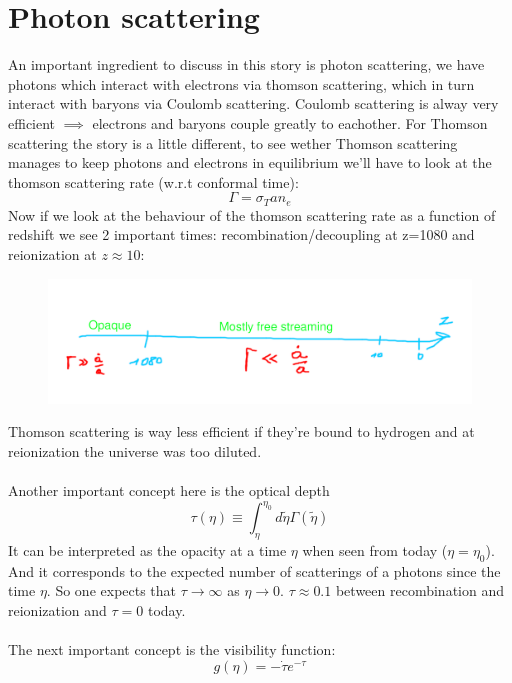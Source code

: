 \documentclass{article}
\begin{document}
 \section{Photon scattering}
 An important ingredient to discuss in this story is photon scattering, we have photons which interact with electrons via thomson scattering, which in turn interact with baryons via Coulomb scattering. Coulomb scattering is alway very efficient $\implies$ electrons and baryons couple greatly to eachother. For Thomson scattering the story is a little different, to see wether Thomson scattering manages to keep photons and electrons in equilibrium we'll have to look at the thomson scattering rate (w.r.t conformal time):
\begin{equation}
   \Gamma = \sigma_T a n_e
\end{equation}
Now if we look at the behaviour of the thomson scattering rate as a function of redshift we see 2 important times: recombination/decoupling at z=1080 and reionization at $z\approx 10$:
\begin{figure}[h]
  \centering
  \includegraphics[scale=0.8]{universetimeline.png}
\end{figure}
Thomson scattering is way less efficient if they're bound to hydrogen and at reionization the universe was too diluted.\\\\
Another important concept here is the optical depth 
\begin{equation}
  \tau(\eta) \equiv \int_\eta^{\eta_0}d\tilde{\eta}\Gamma(\tilde{\eta})
\end{equation}
It can be interpreted as the opacity at a time $\eta$ when seen from today ($\eta = \eta_0$). And it corresponds to the expected number of scatterings of a photons since the time $\eta$. So one expects that $\tau\rightarrow \infty$ as $\eta\rightarrow 0$. $ \tau \approx 0.1$ between recombination and reionization and $\tau=0$ today.
\\\\
The next important concept is the visibility function:
\begin{equation}
  g(\eta) = -\dot{\tau}e^{-\tau}
\end{equation}
\end{document}
